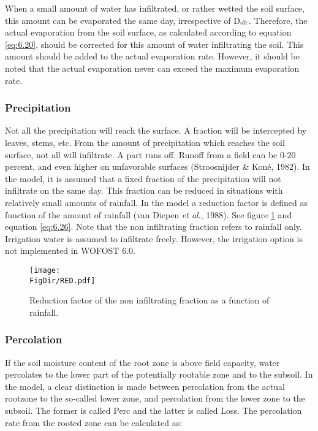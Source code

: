 When a small amount of water has infiltrated, or rather wetted the soil surface, this
amount can be evaporated the same day, irrespective of D$_{{\rm slr}}$. Therefore, the actual
evaporation from the soil surface, as calculated according to equation \ref{eq:6.20}, should be
corrected for this amount of water infiltrating the soil. This amount should be added to
the actual evaporation rate. However, it should be noted that the actual evaporation never
can exceed the maximum evaporation rate.

\subsubsection{Precipitation}
Not all the precipitation will reach the surface. A fraction will be intercepted by leaves,
stems, etc. From the amount of precipitation which reaches the soil surface, not all will
infiltrate. A part runs off. Runoff from a field can be 0-20 percent, and even higher on
unfavorable surfaces (Stroosnijder \& Kon\'{e}, 1982). In the model, it is assumed that a
fixed fraction of the precipitation will not infiltrate on the same day. This fraction can be
reduced in situations with relatively small amounts of rainfall. In the model a reduction
factor is defined as function of the amount of rainfall (van Diepen {\it et al}., 1988). See 
figure \ref{fig:NonInfiltFrac} and equation \ref{eq:6.26}. Note that the non infiltrating 
fraction refers to rainfall only.
Irrigation water is assumed to infiltrate freely. However, the irrigation option is not
implemented in WOFOST 6.0.

\begin{figure}[p]
	\centering
	\texttt{[image: \\FigDir/RED.pdf]}
	\caption{Reduction factor of the non infiltrating fraction as a function of rainfall.}
	\label{fig:NonInfiltFrac}
\end{figure}

\subsubsection{Percolation}
If the soil moisture content of the root zone is above field capacity, water percolates to
the lower part of the potentially rootable zone and to the subsoil. In the model, a clear
distinction is made between percolation from the actual rootzone to the so-called lower
zone, and percolation from the lower zone to the subsoil. The former is called Perc and
the latter is called Loss. The percolation rate from the rooted zone can be calculated as:

